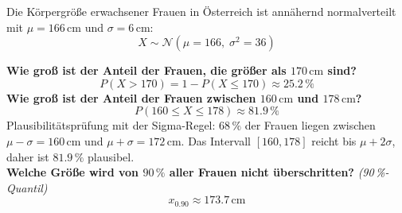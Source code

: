 \begin{bsp}
Die Körpergröße erwachsener Frauen in Österreich ist annähernd normalverteilt mit $\mu = 166\,\mathrm{cm}$ und $\sigma = 6\,\mathrm{cm}$:
\[
    X \sim \mathcal{N}(\mu = 166,\; \sigma^2 = 36)
\]
\begin{center}
\end{center}

\textbf{Wie groß ist der Anteil der Frauen, die größer als $170\,\mathrm{cm}$ sind?}
\[
    P(X > 170) = 1 - P(X \leq 170) \approx 25.2\,\%
\]
\textbf{Wie groß ist der Anteil der Frauen zwischen $160\,\mathrm{cm}$ und $178\,\mathrm{cm}$?}
\[
    P(160 \leq X \leq 178) \approx 81.9\,\%
\]
Plausibilitätsprüfung mit der Sigma-Regel: $68\,\%$ der Frauen liegen zwischen $\mu - \sigma = 160\,\mathrm{cm}$ und $\mu + \sigma = 172\,\mathrm{cm}$. Das Intervall $[160, 178]$ reicht bis $\mu + 2\sigma$, daher ist $81.9\,\%$ plausibel. \\[4pt]
\textbf{Welche Größe wird von $90\,\%$ aller Frauen nicht überschritten?} \emph{(90\,\%-Quantil)}
\[
    x_{0.90} \approx 173.7\,\mathrm{cm}
\]
\end{bsp}